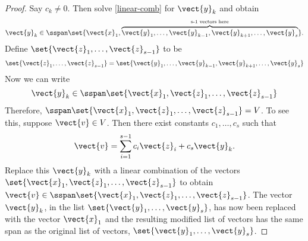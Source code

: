 \begin{proof}
  Say $c_{k}\neq 0$. Then solve {\eqref{linear-comb}} for
  $\vect{y}_{k}$ and obtain
  \begin{equation*}
    \vect{y}_{k}\in \sspan\set{\vect{x}_{1},\overset{\text{s-1
          vectors here}}{\overbrace{\vect{y}_{1},\ldots,\vect{y}_{k-1},\vect{y}
          _{k+1},\ldots,\vect{y}_{s}}}} .
  \end{equation*}
  Define $\set{\vect{z}_{1},\ldots,\vect{z}_{s-1}} $ to be
  \begin{equation*}
    \set{\vect{z}_{1},\ldots,\vect{z}_{s-1}} = \set{
      \vect{y}_{1},\ldots,\vect{y}_{k-1},\vect{y}_{k+1},\ldots,\vect{y}
      _{s}}
  \end{equation*}
  Now we can write
  \begin{equation*}
    \vect{y}_{k}\in \sspan\set{\vect{x}_{1}, \vect{z}_{1},\ldots, \vect{z}_{s-1}}
  \end{equation*}
  Therefore,
  $\sspan\set{\vect{x}_{1},\vect{z}_{1},\ldots,\vect{z }_{s-1}}=V$. To
  see this, suppose $\vect{v}\in V$. Then there exist constants
  $ c_{1},\ldots,c_{s}$ such that
  \begin{equation*}
    \vect{v}=\sum_{i=1}^{s-1}c_{i}\vect{z}_{i}+c_{s}\vect{y}_{k}.
  \end{equation*}
  Replace this $\vect{y}_{k}$ with a linear combination of the vectors
  $\set{\vect{x}_{1},\vect{z}_{1},\ldots,\vect{z}_{s-1}}$ to obtain
  $\vect{v}\in \sspan\set{\vect{x}_{1},\vect{z}
    _{1},\ldots,\vect{z}_{s-1}}$. The vector $\vect{y}_{k}$, in the
  list $\set{\vect{y}_{1},\ldots,\vect{y}_{s}}$, has now been replaced
  with the vector $\vect{x}_{1}$ and the resulting modified list of
  vectors has the same span as the original list of vectors,
  $\set{\vect{y }_{1},\ldots,\vect{y}_{s}}$.


\end{proof}
